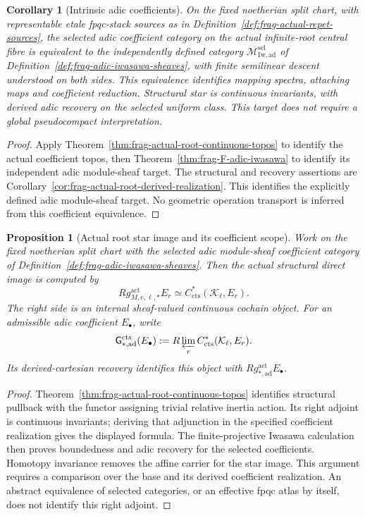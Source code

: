 \documentclass[11pt]{article}
\newtheorem{proposition}[theorem]{Proposition}
\newtheorem{corollary}[theorem]{Corollary}
\theoremstyle{definition}
\theoremstyle{remark}
\begin{document}
\begin{corollary}[Intrinsic adic coefficients]
\label{cor:frag-A0-adic}
On the fixed noetherian split chart, with representable etale fpqc-stack
sources as in Definition~\ref{def:frag-actual-repet-sources}, the selected
adic coefficient category on the actual infinite-root central fibre is
equivalent to the independently defined category
$\mathcal M_{\mathrm{Iw,ad}}^{\mathrm{sel}}$ of
Definition~\ref{def:frag-adic-iwasawa-sheaves}, with finite semilinear
descent understood on both sides.  This equivalence identifies mapping
spectra, attaching maps and coefficient reduction.  Structural star is
continuous invariants, with derived adic recovery on the selected uniform
class.  This target does not require a global pseudocompact interpretation.
\end{corollary}

\begin{proof}
Apply Theorem~\ref{thm:frag-actual-root-continuous-topos} to identify the
actual coefficient topos, then Theorem~\ref{thm:frag-F-adic-iwasawa} to
identify its independent adic module-sheaf target.  The structural and
recovery assertions are Corollary~\ref{cor:frag-actual-root-derived-realization}.
This identifies the explicitly defined adic module-sheaf target.  No geometric operation
transport is inferred from this coefficient equivalence.
\end{proof}


\begin{proposition}[Actual root star image and its coefficient scope]
\label{prop:frag-actual-root-star-direct-image}
Work on the fixed noetherian split chart with the selected adic
module-sheaf coefficient category of
Definition~\ref{def:frag-adic-iwasawa-sheaves}.
Then the actual structural direct image is computed by
\begin{equation}
Rg_{M,e,\ell,*}^{\mathrm{act}}E_r
\simeq C^*_{\mathrm{cts}}(\mathcal K_\ell,E_r).
\label{eq:frag-actual-root-star-equals-continuous-bar}
\end{equation}
The right side is an internal sheaf-valued continuous cochain object.
For an admissible adic coefficient $E_\bullet$, write
\[
 \mathsf G_{*,\mathrm{ad}}^{\mathrm{cts}}(E_\bullet)
 :=R\varprojlim_r C^*_{\mathrm{cts}}(\mathcal K_\ell,E_r).
\]
Its derived-cartesian recovery identifies this object with
$Rg_{*,\mathrm{ad}}^{\mathrm{act}}E_\bullet$.
\end{proposition}

\begin{proof}
Theorem~\ref{thm:frag-actual-root-continuous-topos} identifies structural pullback with the
functor assigning trivial relative inertia action.  Its right adjoint is
continuous invariants; deriving that adjunction in the specified coefficient
realization gives the displayed formula.  The finite-projective Iwasawa
calculation then proves boundedness and adic recovery for the selected
coefficients.  Homotopy invariance removes the affine carrier for the star
image.  This argument requires a comparison over the base and its derived
coefficient realization.  An abstract equivalence of selected categories, or
an effective fpqc atlas by itself, does not identify this right adjoint.
\end{proof}
\end{document}

